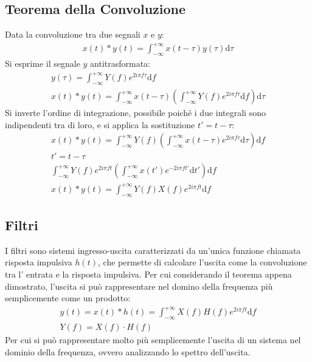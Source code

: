 \documentclass{article}
\newcommand{\df}{\mathrm{d}}
\numberwithin{equation}{subsection}
\begin{document}
\subsection{Teorema della Convoluzione}

Data la convoluzione tra due segnali $x$ e $y$:
\begin{gather*}
    x(t)*y(t)=\displaystyle\int_{-\infty}^{+\infty}x(t-\tau)y(\tau)\df\tau
\end{gather*}
Si esprime il segnale $y$ antitrasformata:
\begin{gather*}
    y(\tau)=\displaystyle\int_{-\infty}^{+\infty}Y(f)e^{2i\pi f\tau}\df f\\
    x(t)*y(t)=\displaystyle\int_{-\infty}^{+\infty}x(t-\tau)\left(\int_{-\infty}^{+\infty}Y(f)e^{2i\pi f\tau}\df f\right)\df\tau
\end{gather*}
Si inverte l'ordine di integrazione, possibile poiché i due integrali sono indipendenti tra di loro, e si applica la sostituzione $t'=t-\tau$: 
\begin{gather*}
    x(t)*y(t)=\displaystyle\int_{-\infty}^{+\infty}Y(f)\left(\int_{-\infty}^{+\infty}x(t-\tau)e^{2i\pi f\tau}\df\tau\right)\df f\\
    t'=t-\tau\\
    \int_{-\infty}^{+\infty}Y(f)e^{2i\pi ft}\left(\int_{-\infty}^{+\infty}x(t')e^{-2i\pi ft'}\df t'\right)\df f\\
    x(t)*y(t)=\displaystyle\int_{-\infty}^{+\infty}Y(f)X(f)e^{2i\pi ft}\df f
\end{gather*}

\subsection{Filtri}

I filtri sono sistemi ingresso-uscita caratterizzati da un'unica funzione chiamata risposta impulsiva $h(t)$, che permette di calcolare l'uscita come la convoluzione tra l'
entrata e la risposta impulsiva. Per cui considerando il teorema appena dimostrato, l'uscita si può rappresentare nel domino della frequenza più semplicemente come un prodotto:
\begin{gather*}
    y(t)=x(t)*h(t)=\displaystyle\int_{-\infty}^{+\infty}X(f)H(f)e^{2i\pi ft}\df f\\
    Y(f)=X(f)\cdot H(f)
\end{gather*}
Per cui si può rappresentare molto più semplicemente l'uscita di un sistema nel dominio della frequenza, ovvero analizzando lo spettro dell'uscita. 
\end{document}
